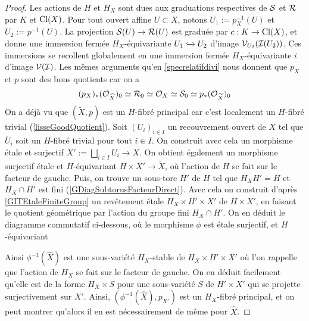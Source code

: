 \begin{proof}
Les actions de $H$ et $H_X$ sont dues aux graduations respectives de $\mathcal{S}$ et $\mathcal{R}$ par $K$ et $\operatorname{Cl}(X)$. Pour tout ouvert affine $U\subset X$, notons $U_1:=p_X^{-1}(U)$ et $U_2:=p^{-1}(U)$. La projection $\mathcal{S}(U)\rightarrow \mathcal{R}(U)$ est graduée par $c:K\rightarrow \operatorname{Cl}(X)$, et donne une immersion fermée $H_X$-équivariante $U_1\xhookrightarrow{} U_2$ d'image $\mathcal{V}_{U_2}(\mathcal{I}(U_2))$. Ces immersions se recollent globalement en une immersion fermée $H_X$-équivariante $i$ d'image $\mathcal{V}(\mathcal{I})$. Les mêmes arguments qu'en \ref{specrelatifdivi} nous donnent que $p_X$ et $p$ sont des bons quotients car on a
$$(p_X)_*(\mathcal{O}_{\widehat{X}})_0\simeq \mathcal{R}_0\simeq\mathcal{O}_X\simeq\mathcal{S}_0\simeq  p_*(\mathcal{O}_{\widetilde{X}})_0$$
On a déjà vu que $(\widetilde{X},p)$ est un $H$-fibré principal car c'est localement un $H$-fibré trivial (\ref{lisseGoodQuotient}). Soit $(U_i)_{i\in I}$ un recouvrement ouvert de $X$ tel que $\widetilde{U_i}$ soit un $H$-fibré trivial pour tout $i\in I$. On construit avec cela un morphisme étale et surjectif $X':=\bigsqcup_{i\in I} U_i\rightarrow X$. On obtient également un morphisme surjectif étale et $H$-équivariant $H\times X'\rightarrow \widetilde{X}$, où l'action de $H$ se fait sur le facteur de gauche. Puis, on trouve un sous-tore $H'$ de $H$ tel que $H_XH'=H$ et $H_X\cap H'$ est fini (\ref{GDiagSubtorusFacteurDirect}). Avec cela on construit d'après \ref{GITEtaleFiniteGroup} un revêtement étale $H_X\times H'\times X'$ de $H\times X'$, en faisant le quotient géométrique par l'action du groupe fini $H_X\cap H'$. On en déduit le diagramme commutatif ci-dessous, où le morphisme $\phi$ est étale surjectif, et $H$-équivariant

	\begin{center}
	\end{center}
Ainsi $\phi^{-1}(\widehat{X})$ est une sous-variété $H_X$-stable de $H_X\times H'\times X'$ où l'on rappelle que l'action de $H_X$ se fait sur le facteur de gauche. On en déduit facilement qu'elle est de la forme $H_X\times S$ pour une sous-variété $S$ de $H'\times X'$ qui se projette surjectivement sur $X'$. Ainsi, $(\phi^{-1}(\widehat{X}),p_{X'})$ est un $H_X$-fibré principal, et on peut montrer qu'alors il en est nécessairement de même pour $\widehat{X}$.


\end{proof}
